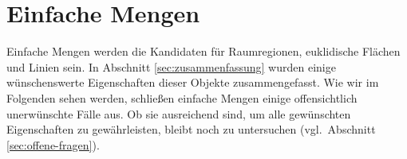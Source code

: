     
    

\section{Einfache Mengen}\label{sec:einf-mengen}

    Einfache Mengen werden die Kandidaten für Raumregionen, euklidische Flächen und Linien sein.
    In Abschnitt \ref{sec:zusammenfassung} wurden einige wünschenswerte Eigenschaften dieser Objekte zusammengefasst.
    Wie wir im Folgenden sehen werden, schließen einfache Mengen einige offensichtlich unerwünschte Fälle aus. 
    Ob sie ausreichend sind, um alle gewünschten Eigenschaften zu gewährleisten, bleibt noch zu untersuchen (vgl.\ Abschnitt \ref{sec:offene-fragen}).


